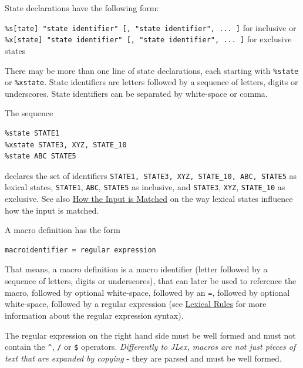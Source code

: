 State declarations have the following form:

\texttt{\%s{[}tate{]}\ "state\ identifier"\ {[},\ "state\ identifier",\ ...\ {]}}
for inclusive
or\\\texttt{\%x{[}state{]}\ "state\ identifier"\ {[},\ "state\ identifier",\ ...\ {]}}
for exclusive states

There may be more than one line of state declarations, each starting
with \texttt{\%state} or \texttt{\%xstate}. State identifiers are
letters followed by a sequence of letters, digits or underscores. State
identifiers can be separated by white-space or comma.

The sequence

\begin{verbatim}
%state STATE1
%xstate STATE3, XYZ, STATE_10
%state ABC STATE5
\end{verbatim}

declares the set of identifiers
\texttt{STATE1,\ STATE3,\ XYZ,\ STATE\_10,\ ABC,\ STATE5} as lexical
states, \texttt{STATE1}, \texttt{ABC}, \texttt{STATE5} as inclusive, and
\texttt{STATE3}, \texttt{XYZ}, \texttt{STATE\_10} as exclusive. See also
\hyperref[HowMatched]{How the Input is Matched} on the way lexical
states influence how the input is matched.


A macro definition has the form

\begin{verbatim}
macroidentifier = regular expression
\end{verbatim}

That means, a macro definition is a macro identifier (letter followed by
a sequence of letters, digits or underscores), that can later be used to
reference the macro, followed by optional white-space, followed by an
\texttt{=}, followed by optional white-space, followed by a regular
expression (see \hyperref[LexRules]{Lexical Rules} for more information
about the regular expression syntax).

The regular expression on the right hand side must be well formed and
must not contain the \texttt{\^{}}, \texttt{/} or \texttt{\$} operators.
\emph{Differently to JLex, macros are not just pieces of text that are
expanded by copying} - they are parsed and must be well formed.

